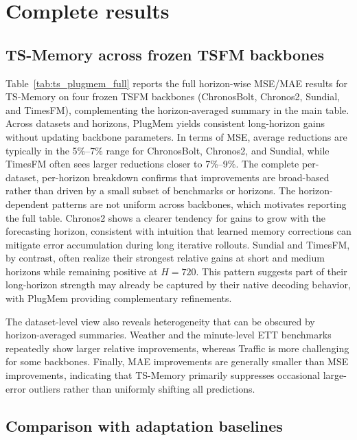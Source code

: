 \section{Complete results}
\label{appx:complete_results}



\subsection{TS-Memory across frozen TSFM backbones}
\label{appx:different-TSFMs-with-TS-Memory}

Table~\ref{tab:ts_plugmem_full} reports the full horizon-wise MSE/MAE results for TS-Memory on four frozen TSFM backbones (ChronosBolt, Chronos2, Sundial, and TimesFM), complementing the horizon-averaged summary in the main table. Across datasets and horizons, PlugMem yields consistent long-horizon gains without updating backbone parameters. In terms of MSE, average reductions are typically in the 5\%--7\% range for ChronosBolt, Chronos2, and Sundial, while TimesFM often sees larger reductions closer to 7\%--9\%. The complete per-dataset, per-horizon breakdown confirms that improvements are broad-based rather than driven by a small subset of benchmarks or horizons. The horizon-dependent patterns are not uniform across backbones, which motivates reporting the full table. Chronos2 shows a clearer tendency for gains to grow with the forecasting horizon, consistent with intuition that learned memory corrections can mitigate error accumulation during long iterative rollouts. Sundial and TimesFM, by contrast, often realize their strongest relative gains at short and medium horizons while remaining positive at $H=720$. This pattern suggests part of their long-horizon strength may already be captured by their native decoding behavior, with PlugMem providing complementary refinements.

The dataset-level view also reveals heterogeneity that can be obscured by horizon-averaged summaries. Weather and the minute-level ETT benchmarks repeatedly show larger relative improvements, whereas Traffic is more challenging for some backbones. Finally, MAE improvements are generally smaller than MSE improvements, indicating that TS-Memory primarily suppresses occasional large-error outliers rather than uniformly shifting all predictions.







\subsection{Comparison with adaptation baselines}
\label{appx:rag-TS-memory}

